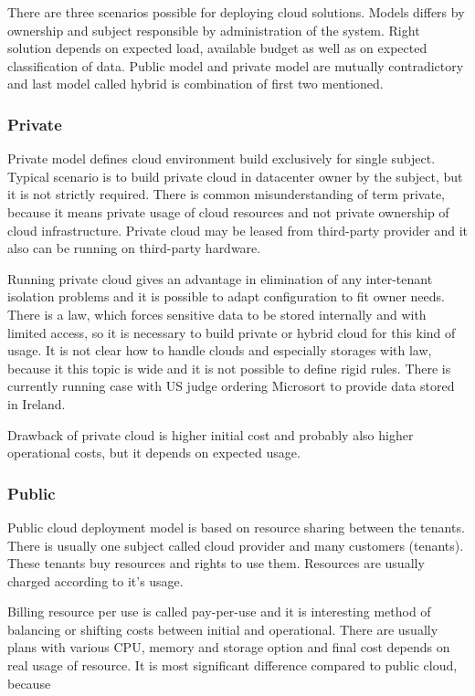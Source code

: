 
There are three scenarios possible for deploying cloud solutions. Models differs by ownership and subject responsible by administration of the system. Right solution depends on expected load, available budget as well as on expected classification of data. Public model and private model are mutually contradictory and last model called hybrid is combination of first two mentioned.

\subsubsection{Private}
Private model defines cloud environment build exclusively for single subject. Typical scenario is to build private cloud in datacenter owner by the subject, but it is not strictly required. There is common misunderstanding of term private, because it means private usage of cloud resources and not private ownership of cloud infrastructure. Private cloud may be leased from third-party provider and it also can be running on third-party hardware.

Running private cloud gives an advantage in elimination of any inter-tenant isolation problems and it is possible to adapt configuration to fit owner needs. There is a law, which forces sensitive data to be stored internally and with limited access, so it is necessary to build private or hybrid cloud for this kind of usage. It is not clear how to handle clouds and especially storages with law, because it this topic is wide and it is not possible to define rigid rules. There is currently running case with \Ac{US} judge ordering Microsort to provide data stored in Ireland. \cite{wp-microsoft-ireland}

Drawback of private cloud is higher initial cost and probably also higher operational costs, but it depends on expected usage.

\subsubsection{Public}
Public cloud deployment model is based on resource sharing between the tenants. There is usually one subject called cloud provider and many customers (tenants). These tenants buy resources and rights to use them. Resources are usually charged according to it's usage.

Billing resource per use is called pay-per-use and it is interesting method of balancing or shifting costs between initial and operational. There are usually plans with various \Ac{CPU}, memory and storage option and final cost depends on real usage of resource. It is most significant difference compared to public cloud, because 

